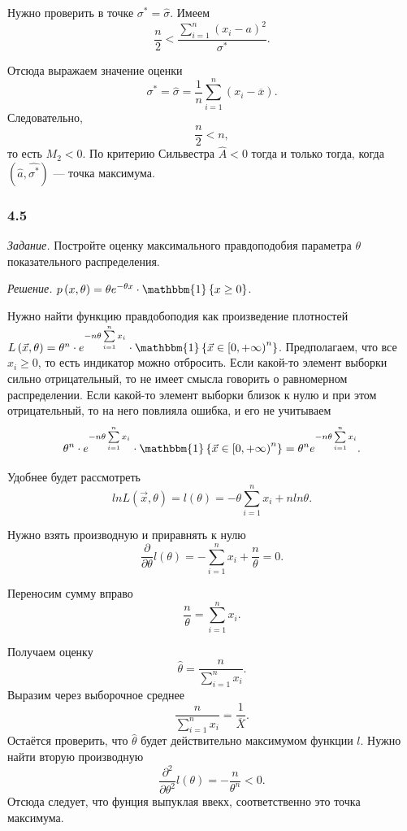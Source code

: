 Нужно проверить в точке $ \sigma^* = \hat{ \sigma }$.
Имеем
$$ \frac{n}{2} <
  \frac{ \sum \limits_{i = 1}^n \left( x_i - a \right)^2}{ \sigma^*}.$$

Отсюда выражаем значение оценки
$$ \sigma^* =
  \hat{ \sigma } =
  \frac{1}{n} \sum \limits_{i = 1}^n \left( x_i - \overline{x} \right).$$
Следовательно,
$$ \frac{n}{2} < n,$$
то есть $M_2 < 0$.
По критерию Сильвестра $ \hat{A} < 0$ тогда и только тогда,
когда $ \left( \hat{a}, \hat{ \sigma^*} \right) $ --- точка максимума.

\subsubsection*{4.5}

\textit{Задание.}
Постройте оценку максимального правдоподобия параметра $ \theta $ показательного распределения.

\textit{Решение.}
$p \left( x, \theta \right) =
  \theta e^{- \theta x} \cdot \mathbbm{1} \left\{ x \geq 0 \right\} $.

Нужно найти функцию правдобоподия как произведение плотностей
$L \left( \vec{x}, \theta \right) =
  \theta^n \cdot e^{-n \theta \sum \limits_{i = 1}^n x_i} \cdot
  \mathbbm{1} \left\{ \vec{x} \in \left[ 0, + \infty \right)^n \right\} $.
Предполагаем, что все $x_i \geq 0$, то есть индикатор можно отбросить.
Если какой-то элемент выборки сильно отрицательный,
то не имеет смысла говорить о равномерном распределении.
Если какой-то элемент выборки близок к нулю и при этом отрицательный, то на него повлияла ошибка,
и его не учитываем
$$ \theta^n \cdot e^{-n \theta \sum \limits_{i = 1}^n x_i} \cdot
  \mathbbm{1} \left\{ \vec{x} \in \left[ 0, + \infty \right)^n \right\} =
  \theta^n e^{-n \theta \sum \limits_{i = 1}^n x_i}.$$

Удобнее будет рассмотреть
$$ln L \left( \vec{x}, \theta \right) =
  l \left( \theta \right) =
  - \theta \sum \limits_{i = 1}^n x_i + n ln \theta.$$

Нужно взять производную и приравнять к нулю
$$ \frac{ \partial }{ \partial \theta } l \left( \theta \right) =
  - \sum \limits_{i = 1}^n x_i + \frac{n}{ \theta } =
  0.$$

Переносим сумму вправо
$$ \frac{n}{ \theta } =
  \sum \limits_{i = 1}^n x_i.$$

Получаем оценку
$$ \hat{ \theta } =
  \frac{n}{ \sum \limits_{i = 1}^n x_i}.$$
Выразим через выборочное среднее
$$ \frac{n}{ \sum \limits_{i = 1}^n x_i} =
  \frac{1}{ \overline{X}}.$$
Остаётся проверить, что $ \hat{ \theta }$ будет действительно максимумом функции $l$.
Нужно найти вторую производную
$$ \frac{ \partial^2}{ \partial \theta^2} l \left( \theta \right) =
  - \frac{n}{ \theta^n} <
  0.$$
Отсюда следует, что фунция выпуклая ввекх, соответственно это точка максимума.

